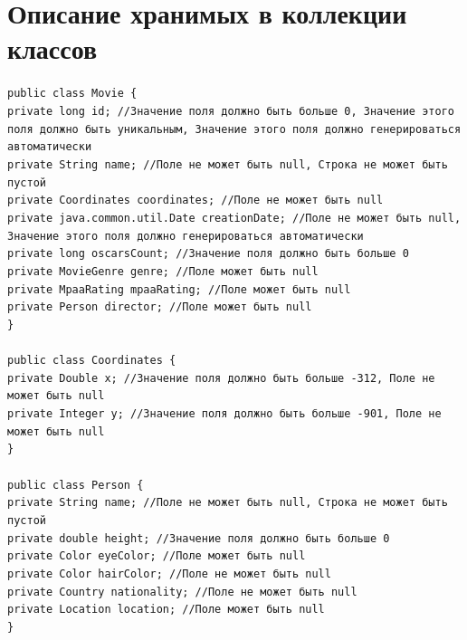 \newpage

\section{Описание хранимых в коллекции классов}
\noindent\texttt{рublic class Movie \{ \\
    private long id; //Значение поля должно быть больше 0, Значение этого поля должно быть уникальным, Значение этого поля должно генерироваться автоматически\\
    private String name; //Поле не может быть null, Строка не может быть пустой\\
    private Coordinates coordinates; //Поле не может быть null\\
    private java.common.util.Date creationDate; //Поле не может быть null, Значение этого поля должно генерироваться автоматически\\
    private long oscarsCount; //Значение поля должно быть больше 0\\
    private MovieGenre genre; //Поле может быть null\\
    private MpaaRating mpaaRating; //Поле может быть null\\
    private Person director; //Поле может быть null\\
    \} \\
    \\
    public class Coordinates \{ \\
    private Double x; //Значение поля должно быть больше -312, Поле не может быть null\\
    private Integer y; //Значение поля должно быть больше -901, Поле не может быть null\\
    \} \\
    \\
    public class Person \{ \\
    private String name; //Поле не может быть null, Строка не может быть пустой\\
    private double height; //Значение поля должно быть больше 0\\
    private Color eyeColor; //Поле может быть null\\
    private Color hairColor; //Поле не может быть null\\
    private Country nationality; //Поле не может быть null\\
    private Location location; //Поле может быть null\\
    \} \\
}
